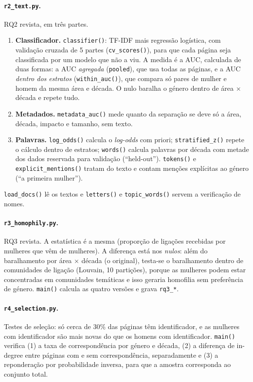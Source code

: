 \documentclass[11pt,a4paper]{article}
\newcommand{\file}[1]{\texttt{#1}}
\newcommand{\fn}[1]{\texttt{#1()}}
\begin{document}
\paragraph{\file{r2_text.py}.} RQ2 revista, em três partes.
\begin{enumerate}
  \item \textbf{Classificador.} \fn{classifier}: TF-IDF mais regressão logística, com validação cruzada de 5 partes (\fn{cv_scores}), para que cada página seja classificada por um modelo que não a viu. A medida é a AUC, calculada de duas formas: a AUC \emph{agregada} (\texttt{pooled}), que usa todas as páginas, e a AUC \emph{dentro dos estratos} (\fn{within_auc}), que compara só pares de mulher e homem da mesma área e década. O nulo baralha o género dentro de área $\times$ década e repete tudo.
  \item \textbf{Metadados.} \fn{metadata_auc} mede quanto da separação se deve só a área, década, impacto e tamanho, sem texto.
  \item \textbf{Palavras.} \fn{log_odds} calcula o \emph{log-odds} com priori; \fn{stratified_z} repete o cálculo dentro de estratos; \fn{words} calcula palavras por década com metade dos dados reservada para validação (``held-out''). \fn{tokens} e \fn{explicit_mentions} tratam do texto e contam menções explícitas ao género (``a primeira mulher'').
\end{enumerate}
\fn{load_docs} lê os textos e \fn{letters} e \fn{topic_words} servem a verificação de nomes.

\paragraph{\file{r3_homophily.py}.} RQ3 revista. A estatística é a mesma (proporção de ligações recebidas por mulheres que vêm de mulheres). A diferença está nos \emph{nulos}: além do baralhamento por área $\times$ década (o original), testa-se o baralhamento dentro de comunidades de ligação (Louvain, 10 partições), porque as mulheres podem estar concentradas em comunidades temáticas e isso geraria homofilia sem preferência de género. \fn{main} calcula as quatro versões e grava \file{rq3_*}.

\paragraph{\file{r4_selection.py}.} Testes de seleção: só cerca de 30\% das páginas têm identificador, e as mulheres com identificador são mais novas do que os homens com identificador. \fn{main} verifica (1) a taxa de correspondência por género e década, (2) a diferença de in-degree entre páginas com e sem correspondência, separadamente e (3) a reponderação por probabilidade inversa, para que a amostra corresponda ao conjunto total.
\end{document}
